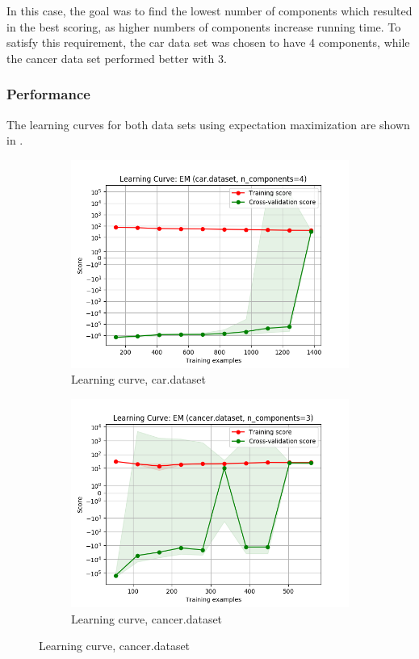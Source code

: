 \documentclass{article}
\begin{document}
        In this case, the goal was to find the lowest number of components which resulted in the best scoring, as higher numbers of components increase running time. To satisfy this requirement, the car data set was chosen to have 4 components, while the cancer data set performed better with 3.

      \subsubsection{Performance}
        The learning curves for both data sets using expectation maximization are shown in .

        \begin{figure}[htb]
        \centering

          \begin{subfigure}{0.5\textwidth}
            \includegraphics[width=\linewidth]{out/em/car-learning.png}
            \caption{Learning curve, car.dataset}
            \label{fig:em-learning-car}
          \end{subfigure}\hfil
          \begin{subfigure}{0.5\textwidth}
            \includegraphics[width=\linewidth]{out/em/cancer-learning.png}
            \caption{Learning curve, cancer.dataset}
            \label{fig:em-learning-cancer}
          \end{subfigure}


\end{figure}
\end{document}
